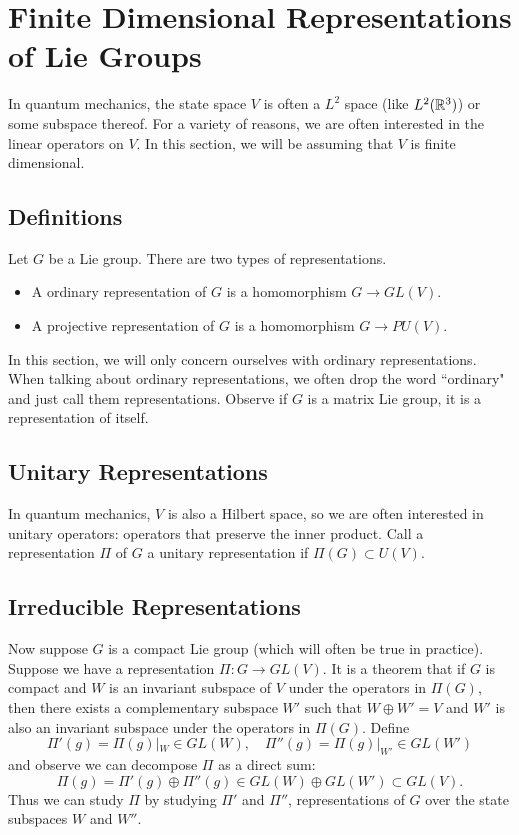 \section{Finite Dimensional Representations of Lie Groups}
In quantum mechanics, the state space $V$ is often a $L^2$ space (like $L^2({\mathbb R}^3)$) or some subspace thereof. For a variety of reasons, we are often interested in the linear operators on $V$. In this section, we will be assuming that $V$ is finite dimensional.

\subsection{Definitions}
Let $G$ be a Lie group. There are two types of representations.
\begin{itemize}
    \item A ordinary representation of $G$ is a homomorphism $G \rightarrow GL(V)$.
    \item A projective representation of $G$ is a homomorphism $G \rightarrow PU(V)$.
\end{itemize}
In this section, we will only concern ourselves with ordinary representations. When talking about ordinary representations, we often drop the word ``ordinary" and just call them representations. Observe if $G$ is a matrix Lie group, it is a representation of itself.

\subsection{Unitary Representations}
In quantum mechanics, $V$ is also a Hilbert space, so we are often interested in unitary operators: operators that preserve the inner product. Call a representation $\Pi$ of $G$ a unitary representation if $\Pi(G) \subset U(V)$.

\subsection{Irreducible Representations}
Now suppose $G$ is a compact Lie group (which will often be true in practice). Suppose we have a representation $\Pi: G \rightarrow GL(V)$. It is a theorem that if $G$ is compact and $W$ is an invariant subspace of $V$ under the operators in $\Pi(G)$, then there exists a complementary subspace $W'$ such that $W \oplus W' = V$ and $W'$ is also an invariant subspace under the operators in $\Pi(G)$. Define
\[
    \Pi'(g) = \Pi(g)|_W \in GL(W), \quad \Pi''(g) = \Pi(g)|_{W'} \in GL(W')
\]
and observe we can decompose $\Pi$ as a direct sum:
\[
    \Pi(g) = \Pi'(g) \oplus \Pi''(g) \in GL(W) \oplus GL(W') \subset GL(V).
\]
Thus we can study $\Pi$ by studying $\Pi'$ and $\Pi''$, representations of $G$ over the state subspaces $W$ and $W''$.

